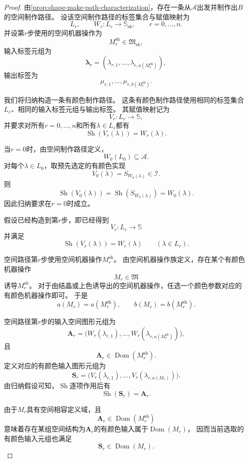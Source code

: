 \documentclass[UTF8,fontset=none]{ctexart}
\theoremstyle{cnthm}
\begin{document}
			\begin{proof}
				由\cref{prop:shape-make-path-characterization}，存在一条从$\mathcal{A}$出发并制作出$B$的空间制作路径。
				设该空间制作路径的标签集合与赋值映射为
				$$
				L_r,\qquad W_r:L_r\to\mathbb{S}_{\mathrm{sh}},
				\qquad r=0,\dots,n.
				$$
				并设第$r$步使用的空间机器操作为
				$$
				M_r^{\mathrm{sh}}\in\mathfrak{M}_{\mathrm{sh}},
				$$
				输入标签元组为
				$$
				\boldsymbol{\lambda}_r
				=
				(\lambda_{r,1},\dots,\lambda_{r,a(M_r^{\mathrm{sh}})}),
				$$
				输出标签为
				$$
				\mu_{r,1},\dots,\mu_{r,b(M_r^{\mathrm{sh}})}.
				$$
				
				我们将归纳构造一条有颜色制作路径。
				这条有颜色制作路径使用相同的标签集合$L_r$、相同的输入标签元组与输出标签。
				其赋值映射记为
				$$
				V_r:L_r\to\mathbb{S},
				$$
				并要求对所有$r=0,\dots,n$和所有$\lambda\in L_r$都有
				$$
				\operatorname{Sh}(V_r(\lambda))=W_r(\lambda).
				$$
				
				当$r=0$时，由空间制作路径定义，
				$$
				W_0(L_0)\subseteq\mathcal{A}.
				$$
				对每个$\lambda\in L_0$，取预先选定的有颜色实现
				$$
				V_0(\lambda)=S_{W_0(\lambda)}\in\mathcal{I}.
				$$
				则
				$$
				\operatorname{Sh}(V_0(\lambda))
				=
				\operatorname{Sh}(S_{W_0(\lambda)})
				=
				W_0(\lambda).
				$$
				因此归纳要求在$r=0$时成立。
				
				假设已经构造到第$r$步，即已经得到
				$$
				V_r:L_r\to\mathbb{S}
				$$
				并满足
				$$
				\operatorname{Sh}(V_r(\lambda))=W_r(\lambda)
				\qquad(\lambda\in L_r).
				$$
				
				空间路径第$r$步使用空间机器操作$M_r^{\mathrm{sh}}$。
				由空间机器操作族定义，存在某个有颜色机器操作
				$$
				M_r\in\mathfrak{M}
				$$
				诱导$M_r^{\mathrm{sh}}$。
				对于由结晶或上色诱导出的空间机器操作，任选一个颜色参数对应的有颜色机器操作即可。
				于是
				$$
				a(M_r)=a(M_r^{\mathrm{sh}}),
				\qquad
				b(M_r)=b(M_r^{\mathrm{sh}}).
				$$
				
				空间路径第$r$步的输入空间图形元组为
				$$
				\mathbf{A}_r
				=
				\bigl(
				W_r(\lambda_{r,1}),\dots,
				W_r(\lambda_{r,a(M_r^{\mathrm{sh}})})
				\bigr),
				$$
				且
				$$
				\mathbf{A}_r\in\operatorname{Dom}(M_r^{\mathrm{sh}}).
				$$
				定义对应的有颜色输入图形元组为
				$$
				\mathbf{S}_r
				=
				\bigl(
				V_r(\lambda_{r,1}),\dots,
				V_r(\lambda_{r,a(M_r)})
				\bigr).
				$$
				由归纳假设可知，$\operatorname{Sh}$逐项作用后有
				$$
				\operatorname{Sh}(\mathbf{S}_r)=\mathbf{A}_r.
				$$
				
				由于$M_r$具有空间相容定义域，且
				$$
				\mathbf{A}_r\in\operatorname{Dom}(M_r^{\mathrm{sh}})
				$$
				意味着存在某组空间结构为$\mathbf{A}_r$的有颜色输入属于$\operatorname{Dom}(M_r)$，
				因而当前选取的有颜色输入元组也满足
				$$
				\mathbf{S}_r\in\operatorname{Dom}(M_r).
				$$
				

\end{proof}
\end{document}

